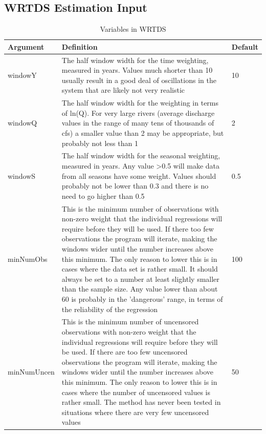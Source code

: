 \documentclass[a4paper,11pt]{article}\usepackage{graphicx, color}
\begin{document}
\subsection{WRTDS Estimation Input}
\label{sec:wrtdsInputVariables}
\begin{table}[ht]
\caption{Variables in WRTDS  \label{tab:WRTDS}}
\begin{tabularx}{\textwidth}{lXl}
\hline
  \textbf{Argument} & \textbf{Definition} & \textbf{Default} \\
\hline
windowY & The half window width for the time weighting, measured in years.  Values much shorter than 10 usually result in a good deal of oscillations in the system that are likely not very realistic & 10\\
windowQ & The half window width for the weighting in terms of ln(Q).  For very large rivers (average discharge values in the range of many tens of thousands of cfs) a smaller value than 2 may be appropriate, but probably not less than 1 & 2 \\
windowS & The half window width for the seasonal weighting, measured in years.  Any value >0.5 will make data from all seasons have some weight.  Values should probably not be lower than 0.3 and there is no need to go higher than 0.5 & 0.5 \\
minNumObs & This is the minimum number of observations with non-zero weight that the individual regressions will require before they will be used.  If there too few observations the program will iterate, making the windows wider until the number increases above this minimum.  The only reason to lower this is in cases where the data set is rather small.  It should always be set to a number at least slightly smaller than the sample size.  Any value lower than about 60 is probably in the 'dangerous' range, in terms of the reliability of the regression & 100 \\ 
minNumUncen & This is the minimum number of uncensored observations with non-zero weight that the individual regressions will require before they will be used.  If there are too few uncensored observations the program will iterate, making the windows wider until the number increases above this minimum.  The only reason to lower this is in cases where the number of uncensored values is rather small.  The method has never been tested in situations where there are very few uncensored values & 50 \\
\hline
\end{tabularx}

\end{table}
\end{document}
